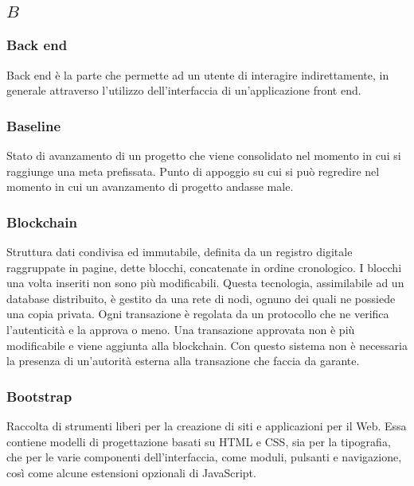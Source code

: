 \subsection*{\quad$B\quad$}
\subsubsection*{Back end}
Back end è la parte che permette ad un utente di interagire indirettamente, in generale attraverso l’utilizzo dell’interfaccia di un’applicazione front end.

\subsubsection*{Baseline}
Stato di avanzamento di un progetto che viene consolidato nel momento in cui si raggiunge una meta prefissata. Punto di appoggio su cui si può regredire nel momento in cui un avanzamento di progetto andasse male.

\subsubsection*{Blockchain}
Struttura dati condivisa ed immutabile, definita da un registro digitale raggruppate in pagine, dette blocchi, concatenate in ordine cronologico. I blocchi una volta inseriti non sono più modificabili. Questa tecnologia, assimilabile ad un database distribuito, è gestito da una rete di nodi, ognuno dei quali ne possiede una copia privata. Ogni transazione è regolata da un protocollo che
ne verifica l’autenticità e la approva o meno. Una transazione approvata non è più modificabile e viene aggiunta alla blockchain. Con questo sistema non è necessaria la presenza di un’autorità esterna alla transazione che faccia da garante.

\subsubsection*{Bootstrap}
Raccolta di strumenti liberi per la creazione di siti e applicazioni per il Web. Essa contiene modelli di progettazione basati su HTML e CSS, sia per la tipografia, che per le varie componenti dell'interfaccia, come moduli, pulsanti e navigazione, così come alcune estensioni opzionali di JavaScript.
